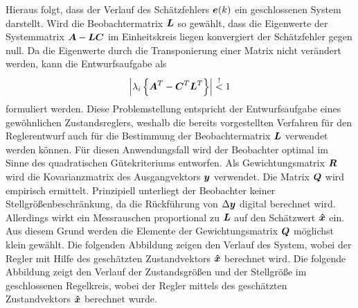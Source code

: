 Hieraus folgt, dass der Verlauf des Schätzfehlers $\boldsymbol{e}(k)$ ein geschlossenen System darstellt. Wird die Beobachtermatrix $\boldsymbol{L}$ so gewählt, dass die Eigenwerte der Systemmatrix $\boldsymbol{A}-\boldsymbol{LC}$ im Einheitskreis liegen konvergiert der Schätzfehler gegen null. Da die Eigenwerte durch die Transponierung einer Matrix nicht verändert werden, kann die Entwurfsaufgabe als
\begin{equation}
\left\vert \lambda_i\left\{\boldsymbol{A}^T-\boldsymbol{C}^T\boldsymbol{L}^T\right\}\right\vert \overset{!}< 1
\end{equation}
formuliert werden. Diese Problemstellung entspricht der Entwurfsaufgabe eines gewöhnlichen Zustandsreglers, weshalb die bereits vorgestellten Verfahren für den Reglerentwurf auch für die Bestimmung der Beobachtermatrix $\boldsymbol{L}$ verwendet werden können. Für diesen Anwendungsfall wird der Beobachter optimal im Sinne des quadratischen Gütekriteriums entworfen. Als Gewichtungsmatrix $\boldsymbol{R}$ wird die Kovarianzmatrix des Ausgangvektors $\boldsymbol{y}$ verwendet. Die Matrix $\boldsymbol{Q}$ wird empirisch ermittelt. Prinzipiell unterliegt der Beobachter keiner Stellgrößenbeschränkung, da die Rückführung von $\Delta\boldsymbol{y}$ digital berechnet wird. Allerdings wirkt ein Messrauschen proportional zu $\boldsymbol{L}$ auf den Schätzwert $\boldsymbol{\hat{x}}$ ein. Aus diesem Grund werden die Elemente der Gewichtungsmatrix $\boldsymbol{Q}$ möglichst klein gewählt. Die folgenden Abbildung zeigen den Verlauf des System, wobei der Regler mit Hilfe des geschätzten Zustandvektors $\boldsymbol{\hat{x}}$ berechnet wird. Die folgende Abbildung zeigt den Verlauf der Zustandsgrößen und der Stellgröße im geschlossenen Regelkreis, wobei der Regler mittels des geschätzten Zustandvektors $\boldsymbol{\hat{x}}$ berechnet wurde.
